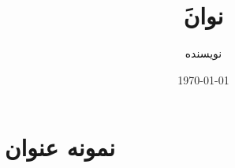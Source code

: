 \documentclass[12pt,a4paper]{article}
\title{َنوان}
\author{نویسنده}
\date{\today}
\begin{document}
\maketitle

\section{نمونه عنوان}
\end{document}
